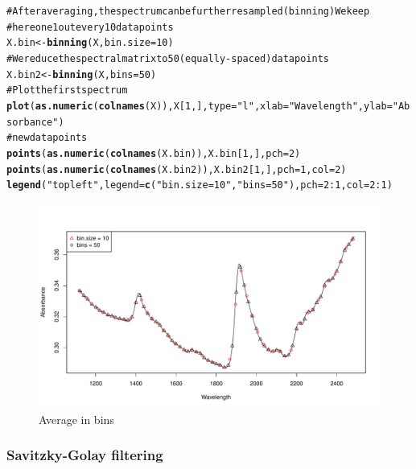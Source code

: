 \documentclass[12pt]{article}\usepackage{graphicx, color}
\makeatletter
\def\maxwidth{ %
  \ifdim\Gin@nat@width>\linewidth
    \linewidth
  \else
    \Gin@nat@width
  \fi
}
\newcommand{\hlfunctioncall}[1]{\textcolor[rgb]{0.501960784313725,0,0.329411764705882}{\textbf{#1}}}%
\newcommand{\hlstring}[1]{\textcolor[rgb]{0.6,0.6,1}{#1}}%
\newcommand{\hlcomment}[1]{\textcolor[rgb]{0.180392156862745,0.6,0.341176470588235}{#1}}%
\newenvironment{kframe}{%
 \def\at@end@of@kframe{}%
 \ifinner\ifhmode%
  \def\at@end@of@kframe{\end{minipage}}%
  \begin{minipage}{\columnwidth}%
 \fi\fi%
 \def\FrameCommand##1{\hskip\@totalleftmargin \hskip-\fboxsep
 \colorbox{shadecolor}{##1}\hskip-\fboxsep
     \hskip-\linewidth \hskip-\@totalleftmargin \hskip\columnwidth}%
 \MakeFramed {\advance\hsize-\width
   \@totalleftmargin\z@ \linewidth\hsize
   \@setminipage}}%
 {\par\unskip\endMakeFramed%
 \at@end@of@kframe}
\newenvironment{knitrout}{}{} %
\makeatother
\begin{document}
\begin{knitrout}
\color{fgcolor}\begin{kframe}
\begin{alltt}
\hlcomment{# After averaging, the spectrum can be further resampled (binning) We keep}
\hlcomment{# here one 1 out every 10 data points}
X.bin <- \hlfunctioncall{binning}(X, bin.size = 10)
\hlcomment{# We reduce the spectral matrix to 50 (equally-spaced) data points}
X.bin2 <- \hlfunctioncall{binning}(X, bins = 50)
\hlcomment{# Plot the first spectrum}
\hlfunctioncall{plot}(\hlfunctioncall{as.numeric}(\hlfunctioncall{colnames}(X)), X[1, ], type = \hlstring{"l"}, xlab = \hlstring{"Wavelength"}, ylab = \hlstring{"Absorbance"})
\hlcomment{# new data points}
\hlfunctioncall{points}(\hlfunctioncall{as.numeric}(\hlfunctioncall{colnames}(X.bin)), X.bin[1, ], pch = 2)
\hlfunctioncall{points}(\hlfunctioncall{as.numeric}(\hlfunctioncall{colnames}(X.bin2)), X.bin2[1, ], pch = 1, col = 2)
\hlfunctioncall{legend}(\hlstring{"topleft"}, legend = \hlfunctioncall{c}(\hlstring{"bin.size = 10"}, \hlstring{"bins = 50"}), pch = 2:1, col = 2:1)
\end{alltt}
\end{kframe}\begin{figure}[t]

\includegraphics[width=\maxwidth]{figure/binning} \caption[Average in bins]{Average in bins\label{fig:binning}}
\end{figure}


\end{knitrout}


\subsubsection{Savitzky-Golay filtering}
\end{document}
